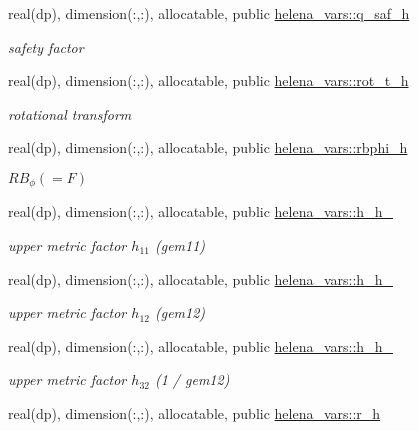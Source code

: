 \begin{DoxyCompactItemize}
real(dp), dimension(\+:,\+:), allocatable, public \hyperlink{namespacehelena__vars_a95906460e4a767f4dd020100b93a631c}{helena\+\_\+vars\+::q\+\_\+saf\+\_\+h}
\begin{DoxyCompactList}\small\item\em safety factor \end{DoxyCompactList}\item 
real(dp), dimension(\+:,\+:), allocatable, public \hyperlink{namespacehelena__vars_ae54b26f364e5cc4da39bbb01807e0da1}{helena\+\_\+vars\+::rot\+\_\+t\+\_\+h}
\begin{DoxyCompactList}\small\item\em rotational transform \end{DoxyCompactList}\item 
real(dp), dimension(\+:,\+:), allocatable, public \hyperlink{namespacehelena__vars_a1983723af0d1de605be96d47ae31d5fc}{helena\+\_\+vars\+::rbphi\+\_\+h}
\begin{DoxyCompactList}\small\item\em $R B_\phi (= F) $ \end{DoxyCompactList}\item 
real(dp), dimension(\+:,\+:), allocatable, public \hyperlink{namespacehelena__vars_acb51f1141d5faeeef88bbf7fc6bab55f}{helena\+\_\+vars\+::h\+\_\+h\+\_}
\begin{DoxyCompactList}\small\item\em upper metric factor $h_{11}$ ({\ttfamily gem11}) \end{DoxyCompactList}\item 
real(dp), dimension(\+:,\+:), allocatable, public \hyperlink{namespacehelena__vars_ab3fee13ba0983e009a160324044cb708}{helena\+\_\+vars\+::h\+\_\+h\+\_}
\begin{DoxyCompactList}\small\item\em upper metric factor $h_{12}$ ({\ttfamily gem12}) \end{DoxyCompactList}\item 
real(dp), dimension(\+:,\+:), allocatable, public \hyperlink{namespacehelena__vars_a1456485c35bfb60ed2d7f93d611a7b5d}{helena\+\_\+vars\+::h\+\_\+h\+\_}
\begin{DoxyCompactList}\small\item\em upper metric factor $h_{32}$ (1 / {\ttfamily gem12}) \end{DoxyCompactList}\item 
real(dp), dimension(\+:,\+:), allocatable, public \hyperlink{namespacehelena__vars_a0d157eace0479c9b8cbd4de9495f9775}{helena\+\_\+vars\+::r\+\_\+h}

\end{DoxyCompactItemize}
